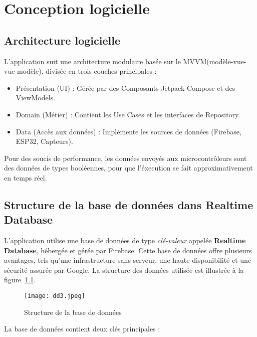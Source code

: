 \pagestyle{fancy}
\fancyhead{} %
\chapter{Conception logicielle}

\section{Architecture logicielle}
L’application suit une architecture modulaire basée sur le MVVM(modèle-vue-vue modèle), divisée en trois couches principales :

\begin{itemize}
\item    Présentation (UI) : Gérée par des Composants Jetpack Compose et des ViewModels.

\item    Domain (Métier) : Contient les Use Cases et les interfaces de Repository.

\item    Data (Accès aux données) : Implémente les sources de données (Firebase, ESP32, Capteurs).
\end{itemize}

Pour des soucis de performance, les données envoyés aux microcontrôleurs sont des données de types booléennes, pour que l'éxecution se fait approximativement en temps réel. 


\section{Structure de la base de données dans Realtime Database}

L'application utilise une base de données de type \textit{clé-valeur} appelée \textbf{Realtime Database}, hébergée et gérée par Firebase. Cette base de données offre plusieurs avantages, tels qu'une infrastructure sans serveur, une haute disponibilité et une sécurité assurée par Google. La structure des données utilisée est illustrée à la figure~\ref{fig:structure_de_la_base_de_donnees}.

\begin{figure}[H]
   \centering
   \texttt{[image: dd3.jpeg]}
   \caption{Structure de la base de données}
   \label{fig:structure_de_la_base_de_donnees}
\end{figure}

La base de données contient deux clés principales :

